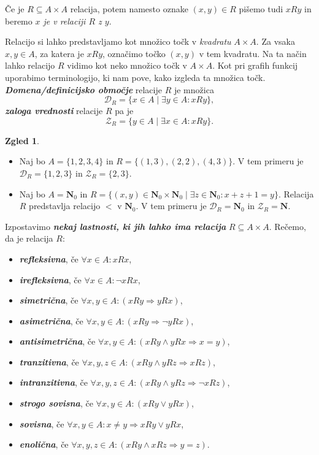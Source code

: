 \documentclass[11pt]{book}
\def\NN{\mathbf{N}}
\def\definicija{\color{rdeca}\bf\em}
\theoremstyle{definition}
\theoremstyle{zgled}
\newtheorem*{zgled}{Zgled}
\theoremstyle{odprtproblem}
\theoremstyle{domacanaloga}
\theoremstyle{izrek}
\begin{document}
Če je $R \subseteq A \times A$ relacija, potem namesto oznake $(x,y) \in R$ pišemo tudi $xRy$ in beremo \emph{$x$ je v relaciji $R$ z $y$}. 

Relacijo si lahko predstavljamo kot množico točk v \emph{kvadratu} $A \times A$. Za vsaka $x,y \in A$, za katera je $xRy$, označimo točko $(x,y)$ v tem kvadratu. Na ta način lahko relacijo $R$ vidimo kot neko množico točk v $A \times A$. Kot pri grafih funkcij uporabimo terminologijo, ki nam pove, kako izgleda ta množica točk. {\definicija Domena/definicijsko območje} relacije $R$ je množica
\[
    \mathcal{D}_R = \{ x \in A \mid \exists y \in A \colon x R y \},
\]
{\definicija zaloga vrednosti} relacije $R$ pa je
\[
    \mathcal{Z}_R = \{ y \in A \mid \exists x \in A \colon x R y \}.
\]

\begin{zgled} \leavevmode
    \begin{itemize}
        \item Naj bo $A = \{ 1,2,3,4 \}$ in $R = \{ (1,3), (2,2), (4,3) \}$. V tem primeru je $\mathcal{D}_R = \{1,2,3\}$ in $\mathcal{Z}_R = \{2,3\}$.
        \item Naj bo $A = \NN_0$ in $R  = \{ (x,y) \in \NN_0 \times \NN_0 \mid \exists z \in \NN_0 \colon x + z + 1 = y \}$. Relacija $R$ predstavlja relacijo $<$ v $\NN_0$. V tem primeru je $\mathcal{D}_R = \NN_0$ in $\mathcal{Z}_R = \NN$.
    \end{itemize}
\end{zgled}

Izpostavimo {\definicija nekaj lastnosti, ki jih lahko ima relacija} $R \subseteq A \times A$. Rečemo, da je relacija $R$:
\begin{itemize}
    \item {\definicija refleksivna}, če $\forall x \in A \colon x R x$,
    \item {\definicija irefleksivna}, če $\forall x \in A \colon \lnot x R x$,
    \item {\definicija simetrična}, če $\forall x,y \in A \colon (x R y \Rightarrow y R x)$,
    \item {\definicija asimetrična}, če $\forall x,y \in A \colon (x R y \Rightarrow \lnot y R x)$,
    \item {\definicija antisimetrična}, če $\forall x,y \in A \colon (xRy \land yRx \Rightarrow x = y)$,
    \item {\definicija tranzitivna}, če $\forall x,y,z \in A \colon (xRy \land yRz \Rightarrow xRz)$,
    \item {\definicija intranzitivna}, če $\forall x,y,z \in A \colon (xRy \land yRz \Rightarrow \lnot xRz)$,
    \item {\definicija strogo sovisna}, če $\forall x,y \in A \colon (xRy \lor yRx)$,
    \item {\definicija sovisna}, če $\forall x,y \in A \colon x \neq y \Rightarrow xRy \lor yRx$,
    \item {\definicija enolična}, če $\forall x,y,z \in A \colon (xRy \land xRz \Rightarrow y = z)$.
\end{itemize}
\end{document}
